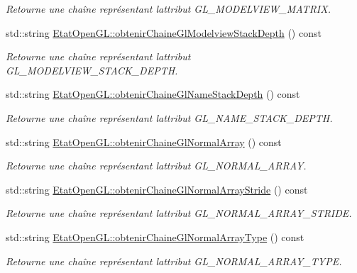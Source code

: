 \begin{DoxyCompactItemize}
\begin{DoxyCompactList}\small\item\em Retourne une chaîne représentant l\textquotesingle{}attribut G\+L\+\_\+\+M\+O\+D\+E\+L\+V\+I\+E\+W\+\_\+\+M\+A\+T\+R\+I\+X. \end{DoxyCompactList}\item 
std\+::string \hyperlink{group__utilitaire_ga745672a8704edbf33daef5314f9cdfaf}{Etat\+Open\+G\+L\+::obtenir\+Chaine\+Gl\+Modelview\+Stack\+Depth} () const 
\begin{DoxyCompactList}\small\item\em Retourne une chaîne représentant l\textquotesingle{}attribut G\+L\+\_\+\+M\+O\+D\+E\+L\+V\+I\+E\+W\+\_\+\+S\+T\+A\+C\+K\+\_\+\+D\+E\+P\+T\+H. \end{DoxyCompactList}\item 
std\+::string \hyperlink{group__utilitaire_ga04c7aa5d2e684fa0029e53b8c3b2cda8}{Etat\+Open\+G\+L\+::obtenir\+Chaine\+Gl\+Name\+Stack\+Depth} () const 
\begin{DoxyCompactList}\small\item\em Retourne une chaîne représentant l\textquotesingle{}attribut G\+L\+\_\+\+N\+A\+M\+E\+\_\+\+S\+T\+A\+C\+K\+\_\+\+D\+E\+P\+T\+H. \end{DoxyCompactList}\item 
std\+::string \hyperlink{group__utilitaire_gaa71b4ce64f1a5f86f8822904e51b549f}{Etat\+Open\+G\+L\+::obtenir\+Chaine\+Gl\+Normal\+Array} () const 
\begin{DoxyCompactList}\small\item\em Retourne une chaîne représentant l\textquotesingle{}attribut G\+L\+\_\+\+N\+O\+R\+M\+A\+L\+\_\+\+A\+R\+R\+A\+Y. \end{DoxyCompactList}\item 
std\+::string \hyperlink{group__utilitaire_ga9388bcac733bb55d8bff349828b9d86d}{Etat\+Open\+G\+L\+::obtenir\+Chaine\+Gl\+Normal\+Array\+Stride} () const 
\begin{DoxyCompactList}\small\item\em Retourne une chaîne représentant l\textquotesingle{}attribut G\+L\+\_\+\+N\+O\+R\+M\+A\+L\+\_\+\+A\+R\+R\+A\+Y\+\_\+\+S\+T\+R\+I\+D\+E. \end{DoxyCompactList}\item 
std\+::string \hyperlink{group__utilitaire_gac2ac905eb6421d2ff8edb736557f40e5}{Etat\+Open\+G\+L\+::obtenir\+Chaine\+Gl\+Normal\+Array\+Type} () const 
\begin{DoxyCompactList}\small\item\em Retourne une chaîne représentant l\textquotesingle{}attribut G\+L\+\_\+\+N\+O\+R\+M\+A\+L\+\_\+\+A\+R\+R\+A\+Y\+\_\+\+T\+Y\+P\+E. \end{DoxyCompactList}\item 

\end{DoxyCompactItemize}
